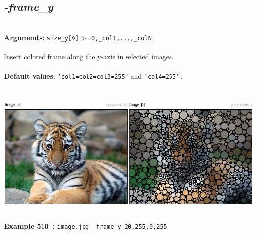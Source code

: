 \documentclass[a4paper,11pt,twoside]{book}
\begin{document}
\subsection{\emph{-frame\_y} }\vspace*{-0.5em}
~\\\textbf{Arguments: } 
{\small \texttt{size\_y[\%]$>$=0,\_col1,...,\_colN}}\\~\\
Insert colored frame along the y-axis in selected images.
~\\~\\\textbf{Default values}: {\small \texttt{'col1=col2=col3=255'} and \texttt{'col4=255'.}}
\begin{center}\includegraphics[keepaspectratio=true,height=7cm,width=\textwidth]{img/gmic_def510.jpg}\\
{\footnotesize \textbf{Example 510~:} \texttt{image.jpg -frame\_y 20,255,0,255}}
\end{center}
\end{document}
